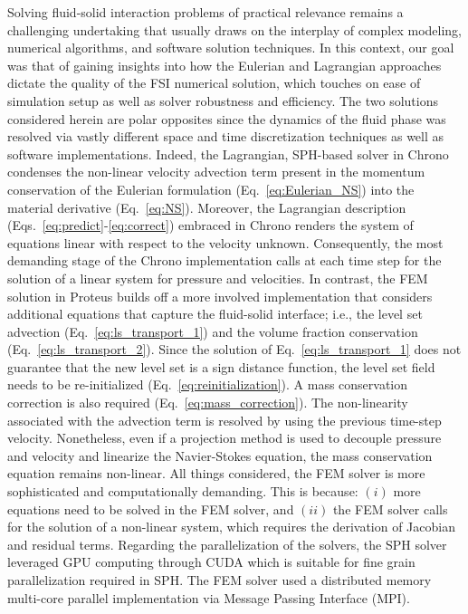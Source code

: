 \documentclass[final,3p,times]{elsarticle}
\begin{document}
Solving fluid-solid interaction problems of practical relevance remains a challenging undertaking that usually draws on the interplay of complex modeling, numerical algorithms, and software solution techniques. In this context, our goal was that of gaining insights into how the Eulerian and Lagrangian approaches dictate the quality of the FSI numerical solution, which touches on ease of simulation setup as well as solver robustness and efficiency. The two solutions considered herein are polar opposites since the dynamics of the fluid phase was resolved via vastly different space and time discretization techniques as well as software implementations. Indeed, the Lagrangian, SPH-based solver in Chrono condenses the non-linear velocity advection term present in the momentum conservation of the Eulerian formulation (Eq.~\eqref{eq:Eulerian_NS}) into the material derivative (Eq.~\eqref{eq:NS}). Moreover, the Lagrangian description (Eqs.~\eqref{eq:predict}-\eqref{eq:correct}) embraced in Chrono renders the system of equations linear with respect to the velocity unknown. Consequently, the most demanding stage of the Chrono implementation calls at each time step for the solution of a linear system for pressure and velocities. In contrast, the FEM solution in Proteus builds off a more involved implementation that considers additional equations that capture the fluid-solid interface; i.e., the level set advection (Eq.~\eqref{eq:ls_transport_1}) and the volume fraction conservation (Eq.~\eqref{eq:ls_transport_2}). Since the solution of Eq.~\eqref{eq:ls_transport_1} does not guarantee that the new level set is a sign distance function, the level set field needs to be re-initialized (Eq.~\eqref{eq:reinitialization}). A mass conservation correction is also required (Eq.~\eqref{eq:mass_correction}). The non-linearity associated with the advection term is resolved by using the previous time-step velocity. Nonetheless, even if a projection method is used to decouple pressure and velocity and linearize the Navier-Stokes equation, the mass conservation equation remains non-linear. All things considered, the FEM solver is more sophisticated and computationally demanding. This is because: $(i)$ more equations need to be solved in the FEM solver, and $(ii)$ the FEM solver calls for the solution of a non-linear system, which requires the derivation of Jacobian and residual terms. Regarding the parallelization of the solvers, the SPH solver leveraged GPU computing through CUDA which is suitable for fine grain parallelization required in SPH. The FEM solver used a distributed memory multi-core parallel implementation via Message Passing Interface (MPI).
\end{document}
